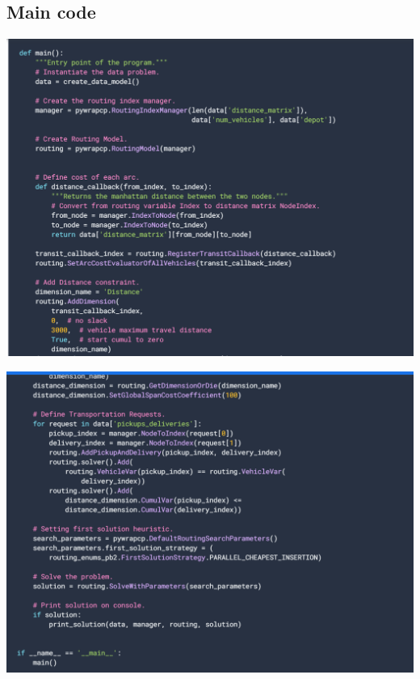 \documentclass[conference]{IEEEtran}
\begin{document}
\begin{center}
\subsection{\textbf{Main code}}  
\begin{center}
\includegraphics[width=1\linewidth]{
4.png}\par  
\end{center}

  
\begin{center}
\includegraphics[width=1\linewidth]{
5.png}\par  
\end{center}


\end{center}
\end{document}
